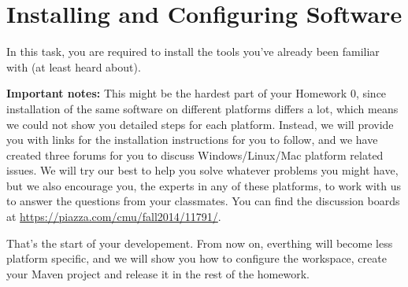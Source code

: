 
\chapter{Installing and Configuring Software}

In this task, you are required to install the tools you've already been familiar
with (at least heard about).

\textbf{Important notes:} This might be the hardest part of your Homework 0,
since installation of the same software on different platforms differs a lot,
which means we could not show you detailed steps for each platform. Instead, we
will provide you with links for the installation instructions for you to follow,
and we have created three forums for you to discuss Windows/Linux/Mac platform
related issues. We will try our best to help you solve whatever problems you
might have, but we also encourage you, the experts in any of these platforms, to
work with us to answer the questions from your classmates. You can find the
discussion boards at \url{https://piazza.com/cmu/fall2014/11791/}.









That's the start of your developement. From now on, everthing will become less
platform specific, and we will show you how to configure the workspace, create
your Maven project and release it in the rest of the homework.


